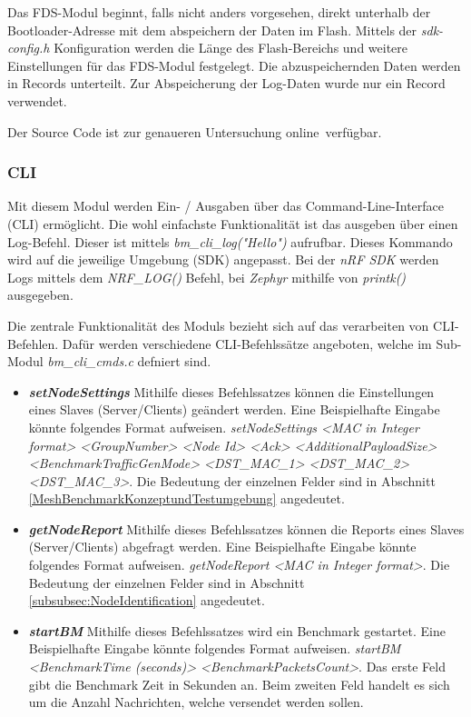 Das FDS-Modul beginnt, falls nicht anders vorgesehen, direkt unterhalb der Bootloader-Adresse mit dem abspeichern der Daten im Flash. Mittels der \textit{sdk-config.h} Konfiguration werden die Länge des Flash-Bereichs und weitere Einstellungen für das FDS-Modul festgelegt. Die abzuspeichernden Daten werden in Records unterteilt. Zur Abspeicherung der Log-Daten wurde nur ein Record verwendet. \cite{nordic_semi_nrf5_sdk_flash_data_storage_2020}

Der Source Code ist zur genaueren Untersuchung online\footnotemark\ verfügbar. 


\subsubsection{CLI}\label{subsubsec:CLI}

Mit diesem Modul werden Ein- / Ausgaben über das Command-Line-Interface (CLI) ermöglicht. Die wohl einfachste Funktionalität ist das ausgeben über einen Log-Befehl. Dieser ist mittels \textit{bm\_cli\_log("Hello")} aufrufbar. Dieses Kommando wird auf die jeweilige Umgebung (SDK) angepasst. Bei der \textit{nRF SDK} werden Logs mittels dem \textit{NRF\_LOG()} Befehl, bei \textit{Zephyr} mithilfe von \textit{printk()} ausgegeben.

Die zentrale Funktionalität des Moduls bezieht sich auf das verarbeiten von CLI-Befehlen. Dafür werden verschiedene CLI-Befehlssätze angeboten, welche im Sub-Modul \textit{bm\_cli\_cmds.c} defniert sind. 

\begin{itemize}
	\item \textit{\textbf{setNodeSettings}} Mithilfe dieses Befehlssatzes können die Einstellungen eines Slaves (Server/Clients) geändert werden. Eine Beispielhafte Eingabe könnte folgendes Format aufweisen. 
	\textit{setNodeSettings <MAC in Integer format> <GroupNumber> <Node Id> <Ack> <AdditionalPayloadSize> <BenchmarkTrafficGenMode> <DST\_MAC\_1> \linebreak <DST\_MAC\_2> <DST\_MAC\_3>}. Die Bedeutung der einzelnen Felder sind in Abschnitt \ref{MeshBenchmarkKonzeptundTestumgebung} angedeutet.
	\item \textit{\textbf{getNodeReport}} Mithilfe dieses Befehlssatzes können die Reports eines Slaves (Server/Clients) abgefragt werden. Eine Beispielhafte Eingabe könnte folgendes Format aufweisen. 
	\textit{getNodeReport <MAC in Integer format>}. Die Bedeutung der einzelnen Felder sind in Abschnitt \ref{subsubsec:NodeIdentification} angedeutet. 
	\item \textit{\textbf{startBM}} Mithilfe dieses Befehlssatzes wird ein Benchmark gestartet. Eine Beispielhafte Eingabe könnte folgendes Format aufweisen. 
	\textit{startBM <BenchmarkTime (seconds)> <BenchmarkPacketsCount>}. Das erste Feld gibt die Benchmark Zeit in Sekunden an. Beim zweiten Feld handelt es sich um die Anzahl Nachrichten, welche versendet werden sollen. 
\end{itemize}

